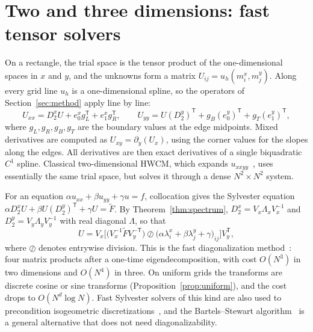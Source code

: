 \documentclass[preprint,12pt]{elsarticle}
\theoremstyle{remark}
\begin{document}
\section{Two and three dimensions: fast tensor solvers}\label{sec:tensor}
On a rectangle, the trial space is the tensor product of the one-dimensional spaces in $x$ and $y$,
and the unknowns form a matrix $U_{ij}=u_h(m^x_i,m^y_j)$. Along every grid line $u_h$ is a
one-dimensional spline, so the operators of Section~\ref{sec:method} apply line by line:
\begin{equation}\label{eq:tensorops}
U_{xx}=D_2^xU+e_0^x g_L^{\mathsf T}+e_1^x g_R^{\mathsf T},\qquad
U_{yy}=U(D_2^y)^{\mathsf T}+g_B(e_0^y)^{\mathsf T}+g_T(e_1^y)^{\mathsf T},
\end{equation}
where $g_L,g_R,g_B,g_T$ are the boundary values at the edge midpoints. Mixed derivatives are computed as
$U_{xy}=\partial_y(U_x)$, using the corner values for the slopes along the edges. All derivatives are
then exact derivatives of a single biquadratic $C^1$ spline. Classical two-dimensional HWCM, which
expands $u_{xxyy}$~\cite{lepik2011solving,oruc2019nonuniform}, uses essentially the same trial space, but
solves it through a dense $N^2\times N^2$ system.

For an equation $\alpha u_{xx}+\beta u_{yy}+\gamma u=f$, collocation gives the Sylvester equation
$\alpha D_2^xU+\beta U(D_2^y)^{\mathsf T}+\gamma U=\tilde F$. By Theorem~\ref{thm:spectrum},
$D_2^x=V_x\Lambda_xV_x^{-1}$ and $D_2^y=V_y\Lambda_yV_y^{-1}$ with real diagonal $\Lambda$, so that
\begin{equation}\label{eq:fdm}
U=V_x\Big[\big(V_x^{-1}\tilde FV_y^{-\mathsf T}\big)\oslash\big(\alpha\lambda^x_i+\beta\lambda^y_j+\gamma\big)_{ij}\Big]V_y^{\mathsf T},
\end{equation}
where $\oslash$ denotes entrywise division. This is the fast diagonalization method~\cite{lynch1964direct}:
four matrix products after a one-time eigendecomposition, with cost $O(N^3)$ in two dimensions and
$O(N^4)$ in three. On uniform grids the transforms are discrete cosine or sine transforms
(Proposition~\ref{prop:uniform}), and the cost drops to $O(N^d\log N)$. Fast Sylvester solvers of this
kind are also used to precondition isogeometric discretizations~\cite{sangalli2016isogeometric}, and the
Bartels--Stewart algorithm~\cite{bartels1972solution} is a general alternative that does not need
diagonalizability.
\end{document}
